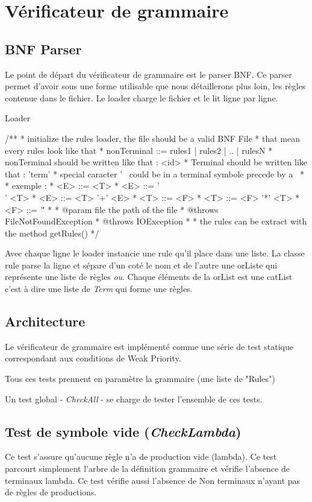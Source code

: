 \section{Vérificateur de grammaire}
	\subsection{BNF Parser}
	Le point de départ du vérificateur de grammaire est le parser BNF. Ce parser permet d'avoir sous une forme utilisable que nous détaillerons 
plus loin, les règles contenue dans le fichier. Le loader charge le fichier et le lit ligne par ligne.

Loader
\begin{verbatim*}
	/**
	 * initialize the rules loader, the file should be a valid BNF File
	 * that mean every rules look like that
	 * nonTerminal ::= rules1 | rules2 | .. | rulesN
	 * nonTerminal should be written like that : <id>
	 * Terminal should be written like that : 'term'
	 * special caracter  ' \ could be in a terminal symbole precede by a \
	 * 
	 * exemple : 
	 * <E> ::= <T> 
	 * <E> ::= '\\' <T> 
	 * <E> ::= <T> '+' <E>
	 * <T> ::= <F>
	 * <T> ::= <F> '*' <T> 
	 * <F> ::= '\''
	 *  
	 * @param file the path of the file
	 * @throws FileNotFoundException
	 * @throws IOException
	 * 
	 * the rules can be extract with the method getRules()
	 */
\end{verbatim*}

Avec chaque ligne le loader instancie une rule qu'il place dans une liste. La classe rule parse la ligne et sépare d'un coté le nom et de l'autre
une orListe qui représente une liste de règles \textit{ou}. Chaque éléments de la orList est une catList c'est à dire une liste de \textit{Term} qui forme une règles.

	\subsection{Architecture}
	Le vérificateur de grammaire est implémenté comme une série de test
	statique correspondant aux conditions de Weak Priority.
	
	Tous ces tests prennent en paramètre la grammaire (une liste de "Rules")

	Un test global - \emph{CheckAll} - se charge de tester l'ensemble de ces tests.


	\subsection{Test de symbole vide (\emph{CheckLambda})}
		Ce test s'assure qu'aucune règle n'a de production vide (lambda).
		Ce test parcourt simplement l'arbre de la définition grammaire et
		vérifie l'absence de terminaux lambda. Ce test vérifie aussi l'absence
		de Non terminaux n'ayant pas de règles de productions. 

